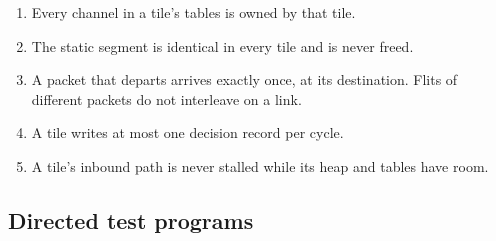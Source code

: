 \documentclass[10.5pt,a4paper]{extarticle}
\theoremstyle{definition}
\theoremstyle{remark}
\begin{document}
\begin{enumerate}[label=I\arabic*.,start=10]
\item Every channel in a tile's tables is owned by that tile.
\item The static segment is identical in every tile and is never freed.
\item A packet that departs arrives exactly once, at its destination. Flits
of different packets do not interleave on a link.
\item A tile writes at most one decision record per cycle.
\item A tile's inbound path is never stalled while its heap and tables have
room.
\end{enumerate}

\subsection{Directed test programs}
\end{document}
